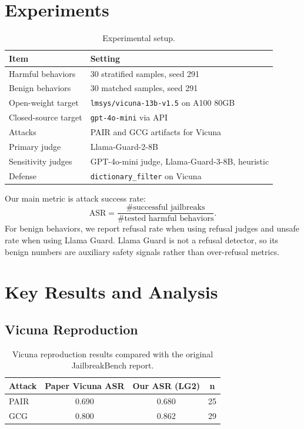 \documentclass{article}
\begin{document}
\section{Experiments}

\begin{table}[h]
\centering
\begin{tabular}{ll}
\toprule
Item & Setting \\
\midrule
Harmful behaviors & 30 stratified samples, seed 291 \\
Benign behaviors & 30 matched samples, seed 291 \\
Open-weight target & \texttt{lmsys/vicuna-13b-v1.5} on A100 80GB \\
Closed-source target & \texttt{gpt-4o-mini} via API \\
Attacks & PAIR and GCG artifacts for Vicuna \\
Primary judge & Llama-Guard-2-8B \\
Sensitivity judges & GPT-4o-mini judge, Llama-Guard-3-8B, heuristic \\
Defense & \texttt{dictionary\_filter} on Vicuna \\
\bottomrule
\end{tabular}
\caption{Experimental setup.}
\label{tab:experiment_setup}
\end{table}

Our main metric is attack success rate:
\[
\text{ASR} = \frac{\# \text{successful jailbreaks}}{\# \text{tested harmful behaviors}}.
\]
For benign behaviors, we report refusal rate when using refusal judges and unsafe rate when using Llama Guard. Llama Guard is not a refusal detector, so its benign numbers are auxiliary safety signals rather than over-refusal metrics.

\section{Key Results and Analysis}

\subsection{Vicuna Reproduction}

\begin{table}[h]
\centering
\begin{tabular}{lccc}
\toprule
Attack & Paper Vicuna ASR & Our ASR (LG2) & n \\
\midrule
PAIR & 0.690 & 0.680 & 25 \\
GCG & 0.800 & 0.862 & 29 \\
\bottomrule
\end{tabular}
\caption{Vicuna reproduction results compared with the original JailbreakBench report.}
\label{tab:vicuna_results}
\end{table}
\end{document}
